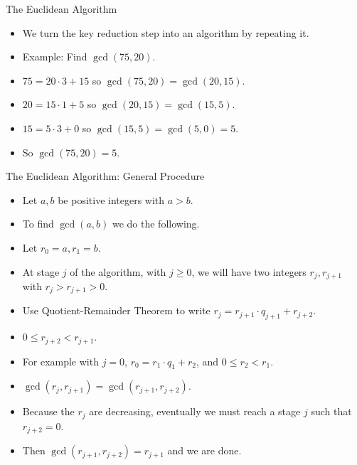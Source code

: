 \documentclass{beamer}
\begin{document}
\begin{frame}{The Euclidean Algorithm}

\begin{itemize}
  \item We turn the key reduction step into an algorithm by repeating it.
  \item Example: Find $\gcd(75, 20)$.
  \item $75 = 20\cdot 3 + 15$ so $\gcd(75, 20) = \gcd(20, 15)$.
  \item $20 = 15 \cdot 1 + 5$ so $\gcd(20, 15) = \gcd(15, 5)$.
  \item $15 = 5 \cdot 3 + 0$ so $\gcd(15, 5) = \gcd(5, 0) = 5$.
  \item So $\gcd(75, 20) = 5$.
\end{itemize}

\end{frame}

\begin{frame}{The Euclidean Algorithm: General Procedure}

\begin{itemize}
  \item Let $a,b$ be positive integers with $a>b$.
  \item To find $\gcd(a,b)$ we do the following.
  \item Let $r_0 = a, r_1 = b$.
  \item At stage $j$ of the algorithm, with $j\geq 0$, we will
  have two integers $r_j, r_{j+1}$ with $r_j > r_{j+1} > 0$.
  \item Use Quotient-Remainder Theorem to write $r_j=r_{j+1} \cdot q_{j+1} + r_{j+2}$.
  \item $0\leq r_{j+2} < r_{j+1}$.
  \item For example with $j=0$, $r_0 = r_{1} \cdot q_{1} + r_2$, and $0\leq r_2 < r_1$.
  \item $\gcd(r_j, r_{j+1}) = \gcd(r_{j+1}, r_{j+2})$.
  \item Because the $r_j$ are decreasing, eventually we must reach a stage $j$ such that $r_{j+2} = 0$.
  \item Then $\gcd(r_{j+1}, r_{j+2}) = r_{j+1}$ and we are done.
\end{itemize}

\end{frame}
\end{document}
